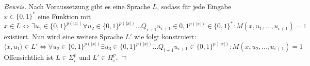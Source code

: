 \begin{proof}[Beweis]
    Nach Voraussetzung gibt es eine Sprache $L$, sodass für jede Eingabe $x \in \{0,1\}^*$ eine Funktion mit 
    $$
    x \in L \Leftrightarrow \exists u_1 \in \{0,1\}^{p(|x|)} \forall u_2 \in \{0,1\}^{p(|x|)} ... Q_{i+1}u_{i + 1} \in {0,1}^{p(|x|)} \in \{0,1\}^* : M(x, u_1, ..., u_{i+1}) = 1
    $$
    existiert.
    Nun wird eine weitere Sprache $L'$ wie folgt konstruiert:
    $$
    \langle x, u_1 \rangle \in L' \Leftrightarrow \forall u_2 \in \{0,1\}^{p(|x|)} \exists u_3 \in \{0,1\}^{p(|x|)} ... Q_{i+1}u_{i + 1} \in \{0,1\}^{p(|x|)} : M(x, u_2, ..., u_{i+1}) = 1
    $$
    Offensichtlich ist $L \in \Sigma^p_i$ und $L' \in \Pi^p_i$.
\end{proof}